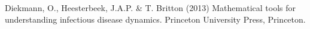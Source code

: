 \documentclass[11pt,a4paper]{article}
\begin{document}

\clearpage 
\begin{thebibliography}{11}
 Diekmann, O., Heesterbeek, J.A.P. \& T. Britton (2013) Mathematical tools for understanding infectious disease dynamics. Princeton University Press, Princeton.
\end{thebibliography}

\end{document}
